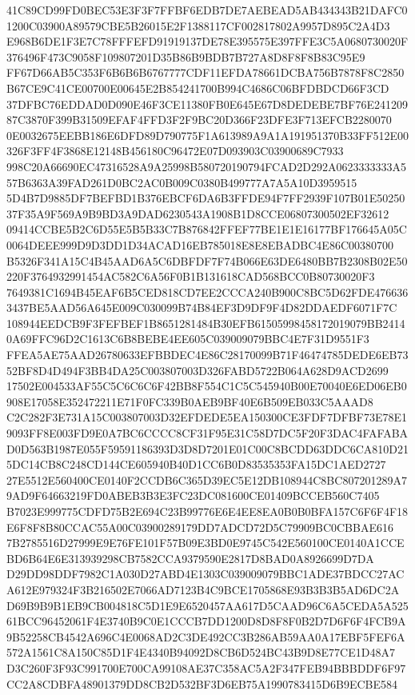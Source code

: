 \documentclass[UTF8,fontset=fandol,zihao=-4,a4paper]{ctexart}
\begin{document}
{{41C89CD99FD0BEC53E3F3F7FFBF6EDB7DE7AEBEAD5AB434343B21DAFC01200C03900A89579CBE5B26015E2F1388117CF002817802A9957D895C2A4D3
E968B6DE1F3E7C78FFFEFD91919137DE78E395575E397FFE3C5A0680730020F376496F473C9058F109807201D35B86B9BDB7B727A8D8F8F8B83C95E9
FF67D66AB5C353F6B6B6B6767777CDF11EFDA78661DCBA756B7878F8C2850B67CE9C41CE00700E00645E2B854241700B994C4686C06BFDBDCD66F3CD
37DFBC76EDDAD0D090E46F3CE11380FB0E645E67D8DEDEBE7BF76E24120987C3870F399B31509EFAF4FFD3F2F9BC20D366F23DFE3F713EFCB2280070
0E0032675EEBB186E6DFD89D790775F1A613989A9A1A191951370B33FF512E00326F3FF4F3868E12148B456180C96472E07D093903C03900689C7933
998C20A66690EC47316528A9A25998B580720190794FCAD2D292A0623333333A557B6363A39FAD261D0BC2AC0B009C0380B499777A7A5A10D3959515
5D4B7D9885DF7BEFBD1B376EBCF6DA6B3FFDE94F7FF2939F107B01E5025037F35A9F569A9B9BD3A9DAD6230543A1908B1D8CCE06807300502EF32612
09414CCBE5B2C6D55E5B5B33C7B876842FFEF77BE1E1E16177BF176645A05C0064DEEE999D9D3DD1D34ACAD16EB785018E8E8EBADBC4E86C00380700
B5326F341A15C4B45AAD6A5C6DBFDF7F74B066E63DE6480BB7B2308B02E50220F3764932991454AC582C6A56F0B1B131618CAD568BCC0B80730020F3
7649381C1694B45EAF6B5CED818CD7EE2CCCA240B900C8BC5D62FDE4766363437BE5AAD56A645E009C030099B74B84EF3D9DF9F4D82DDAEDF6071F7C
108944EEDCB9F3FEFBEF1B8651281484B30EFB61505998458172019079BB24140A69FFC96D2C1613C6B8BEBE4EE605C039009079BBC4E7F31D9551F3
FFEA5AE75AAD26780633EFBBDEC4E86C28170099B71F46474785DEDE6EB7352BF8D4D494F3BB4DA25C003807003D326FABD5722B064A628D9ACD2699
17502E004533AF55C5C6C6C6F42BB8F554C1C5C545940B00E70040E6ED06EB0908E17058E352472211E71F0FC339B0AEB9BF40E6B509EB033C5AAAD8
C2C282F3E731A15C003807003D32EFDEDE5EA150300CE3FDF7DFBF73E78E19093FF8E003FD9E0A7BC6CCCC8CF31F95E31C58D7DC5F20F3DAC4FAFABA
D0D563B1987E055F59591186393D3D8D7201E01C00C8BCDD63DDC6CA810D215DC14CB8C248CD144CE605940B40D1CC6B0D83535353FA15DC1AED2727
27E5512E560400CE0140F2CCDB6C365D39EC5E12DB108944C8BC807201289A79AD9F64663219FD0ABEB3B3E3FC23DC081600CE01409BCCEB560C7405
B7023E999775CDFD75B2E694C23B99776E6E4EE8EA0B0B0BFA157C6F6F4F18E6F8F8B80CCAC55A00C03900289179DD7ADCD72D5C79909BC0CBBAE616
7B2785516D27999E9E76FE101F57B09E3BD0E9745C542E560100CE0140A1CCEBD6B64E6E313939298CB7582CCA9379590E2817D8BAD0A8926699D7DA
D29DD98DDF7982C1A030D27ABD4E1303C039009079BBC1ADE37BDCC27ACA612E979324F3B216502E7066AD7123B4C9BCE1705868E93B3B3B5AD6DC2A
D69B9B9B1EB9CB004818C5D1E9E6520457AA617D5CAAD96C6A5CEDA5A52561BCC96452061F4E3740B9C0E1CCCB7DD1200D8D8F8F0B2D7D6F6F4FCB9A
9B52258CB4542A696C4E0068AD2C3DE492CC3B286AB59AA0A17EBF5FEF6A572A1561C8A150C85D1F4E4340B94092D8CB6D524BC43B9D8E77CE1D48A7
D3C260F3F93C991700E700CA99108AE37C358AC5A2F347FEB94BBBDDF6F97CC2A8CDBFA48901379DD8CB2D532BF3D6EB75A1990783415D6B9ECBE584
}}
\end{document}
